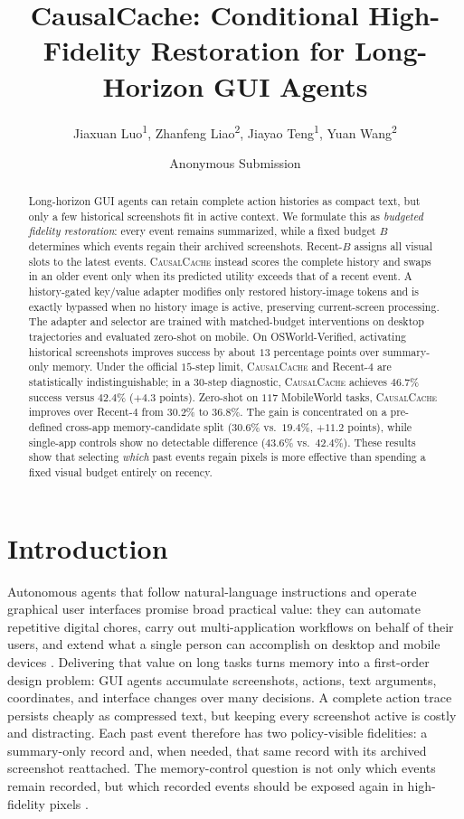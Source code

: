 \documentclass[letterpaper]{article} %
\title{CausalCache: Conditional High-Fidelity Restoration for Long-Horizon GUI Agents}
\author{
Jiaxuan Luo\textsuperscript{\rm 1},
Zhanfeng Liao\textsuperscript{\rm 2},
Jiayao Teng\textsuperscript{\rm 1},
Yuan Wang\textsuperscript{\rm 2}
}
\author{Anonymous Submission}
\newcommand{\method}{\textsc{CausalCache}}
\begin{document}
\maketitle

\begin{abstract}
Long-horizon GUI agents can retain complete action histories as compact
text, but only a few historical screenshots fit in active context. We
formulate this as \emph{budgeted fidelity restoration}: every event
remains summarized, while a fixed budget $B$ determines which events
regain their archived screenshots. Recent-$B$ assigns all visual slots to
the latest events. \method{} instead scores the complete history and
swaps in an older event only when its predicted utility exceeds that of a
recent event. A history-gated key/value adapter modifies only restored
history-image tokens and is exactly bypassed when no history image is
active, preserving current-screen processing. The adapter and selector
are trained with matched-budget interventions on desktop trajectories and
evaluated zero-shot on mobile. On OSWorld-Verified, activating historical
screenshots improves success by about $13$ percentage points over
summary-only memory. Under the official $15$-step limit, \method{} and
Recent-$4$ are statistically indistinguishable; in a $30$-step
diagnostic, \method{} achieves $46.7\%$ success versus $42.4\%$
($+4.3$ points). Zero-shot on $117$ MobileWorld tasks, \method{} improves
over Recent-$4$ from $30.2\%$ to $36.8\%$. The gain is concentrated on a
pre-defined cross-app memory-candidate split ($30.6\%$ vs.\ $19.4\%$,
$+11.2$ points), while single-app controls show no detectable difference
($43.6\%$ vs.\ $42.4\%$). These results show that selecting \emph{which}
past events regain pixels is more effective than spending a fixed visual
budget entirely on recency.
\end{abstract}

\section{Introduction}

Autonomous agents that follow natural-language instructions and operate
graphical user interfaces promise broad practical value: they can automate
repetitive digital chores, carry out multi-application workflows on behalf
of their users, and extend what a single person can accomplish on desktop
and mobile devices \citep{xie2024osworld,rawles2025androidworld,
xu2026mobileagent35}. Delivering that value on long tasks turns memory into
a first-order design problem:
GUI agents accumulate screenshots, actions, text arguments, coordinates, and
interface changes over many decisions. A complete action trace persists
cheaply as compressed text, but keeping every screenshot active is costly and
distracting. Each past
event therefore has two policy-visible fidelities: a summary-only record and,
when needed, that same record with its archived screenshot reattached. The
memory-control question is not only which events remain recorded, but which
recorded events should be exposed again in high-fidelity pixels
\citep{lu2025guiodyssey,zeng2026mementogui,shi2026androtmem}.
\end{document}
